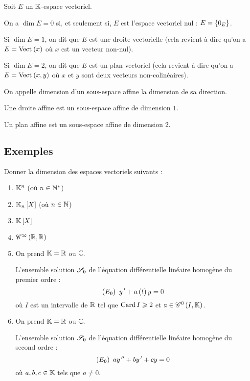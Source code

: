 \begin{defi}
Soit \(E\) un \(\mathbb{K}\)-espace vectoriel.

On a \(\dim E=0\) si, et seulement si, \(E\) est l'espace vectoriel nul : \(E=\left\lbrace0_E\right\rbrace\).

Si \(\dim E=1\), on dit que \(E\) est une droite vectorielle (cela revient à dire qu'on a \(E=\Vect{x}\) où \(x\) est un vecteur non-nul).

Si \(\dim E=2\), on dit que \(E\) est un plan vectoriel (cela revient à dire qu'on a \(E=\Vect{x,y}\) où \(x\) et \(y\) sont deux vecteurs non-colinéaires).
\end{defi}

\begin{defi}
On appelle dimension d'un sous-espace affine la dimension de sa direction.

Une droite affine est un sous-espace affine de dimension \(1\).

Un plan affine est un sous-espace affine de dimension \(2\).
\end{defi}

\subsection{Exemples}

\begin{exoex}
Donner la dimension des espaces vectoriels suivants :

\begin{enumerate}
\item \(\mathbb{K}^n\) (où \(n\in\mathbb{N}^*\)) \\

\item \(\polydeg{n}\) (où \(n\in\mathbb{N}\)) \\

\item \(\poly\) \\

\item \(\mathscr{C}^{\infty}\left(\mathbb{R},\mathbb{R}\right)\) \\

\item On prend \(\mathbb{K}=\mathbb{R}\) ou \(\mathbb{C}\).

L'ensemble solution \(\mathscr{S}_0\) de l'équation différentielle linéaire homogène du premier ordre : \[\left(E_0\right)~y^{\,\prime}+a\left(t\right)y=0\] où \(I\) est un intervalle de \(\mathbb{R}\) tel que \(\operatorname{Card} I\geqslant2\) et \(a\in\mathscr{C}^{0}\left(I,\mathbb{K}\right)\). \\

\item On prend \(\mathbb{K}=\mathbb{R}\) ou \(\mathbb{C}\).

L'ensemble solution \(\mathscr{S}_0\) de l'équation différentielle linéaire homogène du second ordre : \[\left(E_0\right)~ay^{\,\prime\prime}+by^{\,\prime}+cy=0\] où \(a,b,c\in\mathbb{K}\) tels que \(a\not=0\).
\end{enumerate}
\end{exoex}

